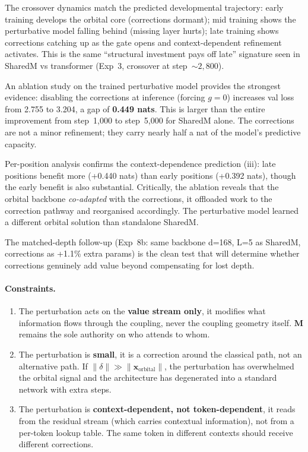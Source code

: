 \documentclass[11pt, a4paper]{article}
\newcommand{\M}{\mathbf{M}}
\newcommand{\x}{\mathbf{x}}
\theoremstyle{remark}
\begin{document}
The crossover dynamics match the predicted developmental trajectory: early training develops the orbital core (corrections dormant); mid training shows the perturbative model falling behind (missing layer hurts); late training shows corrections catching up as the gate opens and context-dependent refinement activates.
This is the same ``structural investment pays off late'' signature seen in SharedM vs transformer (Exp~3, crossover at step~${\sim}2{,}800$).

An ablation study on the trained perturbative model provides the strongest evidence: disabling the corrections at inference (forcing $g{=}0$) increases val loss from 2.755 to 3.204, a gap of \textbf{0.449 nats}.
This is larger than the entire improvement from step~1{,}000 to step~5{,}000 for SharedM alone.
The corrections are not a minor refinement; they carry nearly half a nat of the model's predictive capacity.

Per-position analysis confirms the context-dependence prediction (iii): late positions benefit more (+0.440 nats) than early positions (+0.392 nats), though the early benefit is also substantial.
Critically, the ablation reveals that the orbital backbone \emph{co-adapted} with the corrections, it offloaded work to the correction pathway and reorganised accordingly.
The perturbative model learned a different orbital solution than standalone SharedM.

The matched-depth follow-up (Exp~8b: same backbone d=168, L=5 as SharedM, corrections as +1.1\% extra params) is the clean test that will determine whether corrections genuinely add value beyond compensating for lost depth.

\paragraph{Constraints.}
\begin{enumerate}[nosep]
    \item The perturbation acts on the \textbf{value stream only}, it modifies what information flows through the coupling, never the coupling geometry itself. $\M$ remains the sole authority on who attends to whom.
    \item The perturbation is \textbf{small}, it is a correction around the classical path, not an alternative path. If $\|\delta\| \gg \|\x_{\text{orbital}}\|$, the perturbation has overwhelmed the orbital signal and the architecture has degenerated into a standard network with extra steps.
    \item The perturbation is \textbf{context-dependent, not token-dependent}, it reads from the residual stream (which carries contextual information), not from a per-token lookup table. The same token in different contexts should receive different corrections.
\end{enumerate}
\end{document}
